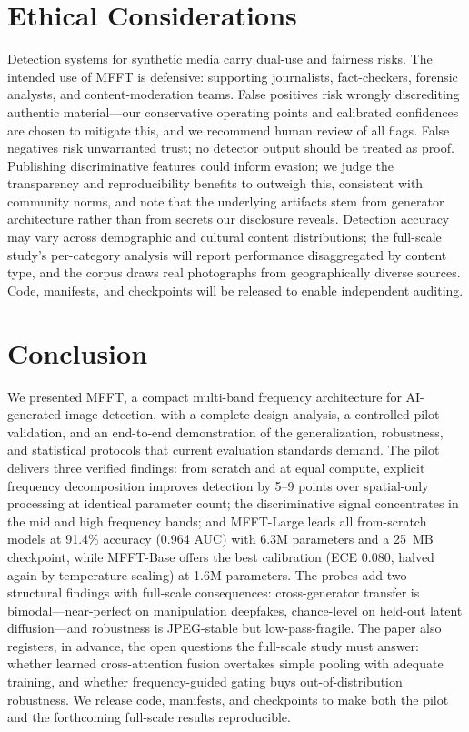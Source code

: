 \documentclass[journal]{IEEEtran}
\begin{document}
\section{Ethical Considerations}
\label{sec:ethics}
Detection systems for synthetic media carry dual-use and fairness risks. The intended use of MFFT is defensive: supporting journalists, fact-checkers, forensic analysts, and content-moderation teams. False positives risk wrongly discrediting authentic material---our conservative operating points and calibrated confidences are chosen to mitigate this, and we recommend human review of all flags. False negatives risk unwarranted trust; no detector output should be treated as proof. Publishing discriminative features could inform evasion; we judge the transparency and reproducibility benefits to outweigh this, consistent with community norms, and note that the underlying artifacts stem from generator architecture rather than from secrets our disclosure reveals. Detection accuracy may vary across demographic and cultural content distributions; the full-scale study's per-category analysis will report performance disaggregated by content type, and the corpus draws real photographs from geographically diverse sources. Code, manifests, and checkpoints will be released to enable independent auditing.

\section{Conclusion}
\label{sec:conclusion}
We presented MFFT, a compact multi-band frequency architecture for AI-generated image detection, with a complete design analysis, a controlled pilot validation, and an end-to-end demonstration of the generalization, robustness, and statistical protocols that current evaluation standards demand. The pilot delivers three verified findings: from scratch and at equal compute, explicit frequency decomposition improves detection by 5--9 points over spatial-only processing at identical parameter count; the discriminative signal concentrates in the mid and high frequency bands; and MFFT-Large leads all from-scratch models at 91.4\% accuracy (0.964 AUC) with 6.3M parameters and a 25~MB checkpoint, while MFFT-Base offers the best calibration (ECE 0.080, halved again by temperature scaling) at 1.6M parameters. The probes add two structural findings with full-scale consequences: cross-generator transfer is bimodal---near-perfect on manipulation deepfakes, chance-level on held-out latent diffusion---and robustness is JPEG-stable but low-pass-fragile. The paper also registers, in advance, the open questions the full-scale study must answer: whether learned cross-attention fusion overtakes simple pooling with adequate training, and whether frequency-guided gating buys out-of-distribution robustness. We release code, manifests, and checkpoints to make both the pilot and the forthcoming full-scale results reproducible.
\end{document}

